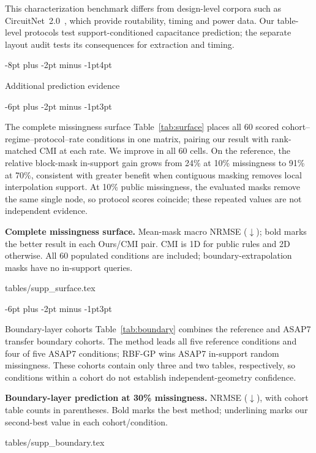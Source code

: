 \documentclass{article}
\makeatletter
\renewcommand{\section}{\@startsection{section}{1}{\z@}
  {-8pt plus -2pt minus -1pt}{4pt}{\large\sc\raggedright}}
\renewcommand{\subsection}{\@startsection{subsection}{2}{\z@}
  {-6pt plus -2pt minus -1pt}{3pt}{\normalsize\sc\raggedright}}
\newcommand{\tabdir}{tables}
\newcommand{\tableinput}[1]{\@@input \tabdir/#1 }
\makeatother
\begin{document}
This characterization benchmark differs from design-level corpora such as
CircuitNet~2.0~\citep{circuitnet2}, which provide routability, timing and power
data. Our table-level protocols test support-conditioned capacitance prediction;
the separate layout audit tests its consequences for extraction and timing.

\section{Additional prediction evidence}
\label{app:surface}

\subsection{The complete missingness surface}
Table~\ref{tab:surface} places all 60 scored cohort--regime--protocol--rate
conditions in one matrix, pairing our result with rank-matched CMI at each
rate. We improve in all 60 cells.
On the reference, the relative block-mask in-support gain grows from 24\%
at 10\% missingness to 91\% at 70\%, consistent with greater benefit when
contiguous masking removes local interpolation support. At 10\% public
missingness, the evaluated masks remove the same single node, so protocol
scores coincide; these repeated values are not independent evidence.

\begin{table}[htbp]
\centering
\caption{\textbf{Complete missingness surface.} Mean-mask macro NRMSE
($\downarrow$); bold marks the better result in each Ours/CMI pair.
CMI is 1D for public rules and 2D otherwise. All 60 populated conditions
are included; boundary-extrapolation masks have no in-support queries.}
\label{tab:surface}\label{tab:surfacetransfer}
\tableinput{supp_surface.tex}
\end{table}

\subsection{Boundary-layer cohorts}
\label{app:boundary}
Table~\ref{tab:boundary} combines the reference and ASAP7 transfer boundary
cohorts. The method leads all five reference conditions and four of five
ASAP7 conditions; RBF-GP wins ASAP7 in-support random missingness.
These cohorts contain only three and two tables, respectively, so conditions
within a cohort do not establish independent-geometry confidence.

\begin{table}[htbp]
\centering
\caption{\textbf{Boundary-layer prediction at 30\% missingness.}
NRMSE ($\downarrow$), with cohort table counts in parentheses.
Bold marks the best method; underlining marks our second-best value
in each cohort/condition.}
\label{tab:boundary}\label{tab:bnd_reference}\label{tab:bnd_asap7}
\tableinput{supp_boundary.tex}
\end{table}
\end{document}

